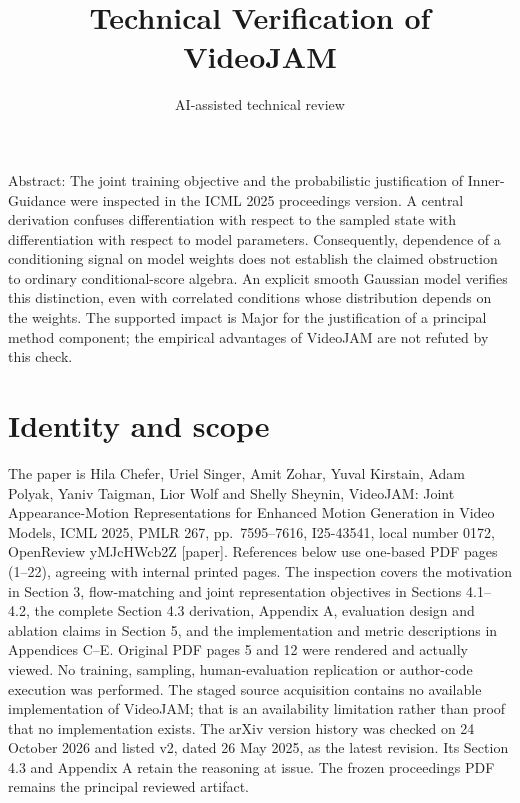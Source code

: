 \documentclass[10pt]{article}
\title{Technical Verification of VideoJAM}
\author{AI-assisted technical review}
\date{}
\begin{document}
\maketitle
Abstract: The joint training objective and the probabilistic justification of Inner-Guidance were inspected in the ICML 2025 proceedings version. A central derivation confuses differentiation with respect to the sampled state with differentiation with respect to model parameters. Consequently, dependence of a conditioning signal on model weights does not establish the claimed obstruction to ordinary conditional-score algebra. An explicit smooth Gaussian model verifies this distinction, even with correlated conditions whose distribution depends on the weights. The supported impact is Major for the justification of a principal method component; the empirical advantages of VideoJAM are not refuted by this check.\par
\section*{Identity and scope}
The paper is Hila Chefer, Uriel Singer, Amit Zohar, Yuval Kirstain, Adam Polyak, Yaniv Taigman, Lior Wolf and Shelly Sheynin, VideoJAM: Joint Appearance-Motion Representations for Enhanced Motion Generation in Video Models, ICML 2025, PMLR 267, pp. 7595–7616, I25-43541, local number 0172, OpenReview yMJcHWcb2Z [paper]. References below use one-based PDF pages (1–22), agreeing with internal printed pages. The inspection covers the motivation in Section 3, flow-matching and joint representation objectives in Sections 4.1–4.2, the complete Section 4.3 derivation, Appendix A, evaluation design and ablation claims in Section 5, and the implementation and metric descriptions in Appendices C–E. Original PDF pages 5 and 12 were rendered and actually viewed. No training, sampling, human-evaluation replication or author-code execution was performed. The staged source acquisition contains no available implementation of VideoJAM; that is an availability limitation rather than proof that no implementation exists. The arXiv version history was checked on 24 October 2026 and listed v2, dated 26 May 2025, as the latest revision. Its Section 4.3 and Appendix A retain the reasoning at issue. The frozen proceedings PDF remains the principal reviewed artifact.\par
\end{document}
